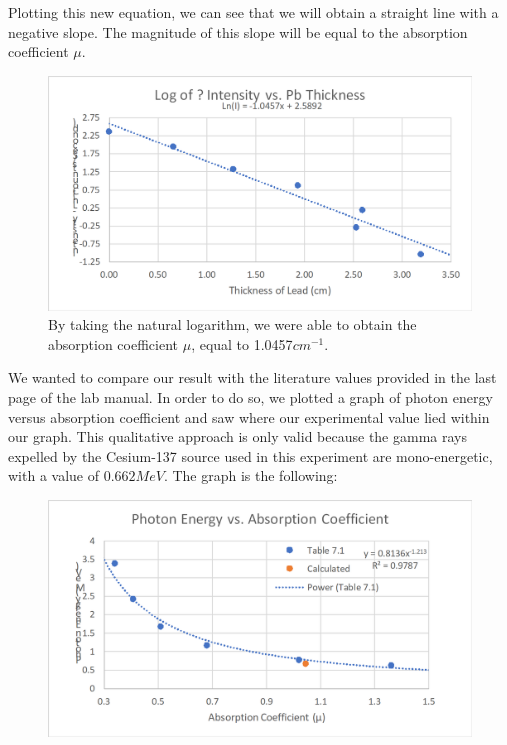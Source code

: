 \documentclass[a4paper]{article}
\begin{document}
  Plotting this new equation, we can see that we will obtain a straight line with a negative slope. The magnitude of this slope will be equal to the absorption coefficient $\mu$. 
  
   \begin{figure}[h]
  \includegraphics[scale=0.75]{lnivsx} 
  \centering
  \caption{By taking the natural logarithm, we were able to obtain the absorption coefficient $\mu$, equal to 1.0457$cm^{-1}$.}
  \end{figure}
  
  We wanted to compare our result with the literature values provided in the last page of the lab manual. In order to do so, we plotted a graph of photon energy versus absorption coefficient and saw where our experimental value lied within our graph. This qualitative approach is only valid because the gamma rays expelled by the Cesium-137 source used in this experiment are mono-energetic, with a value of $0.662MeV$. The graph is the following:

 \begin{figure}[h]
  \includegraphics[scale=0.75]{energyvscoeff} 
  \centering
  \end{figure}
  
\end{document}
